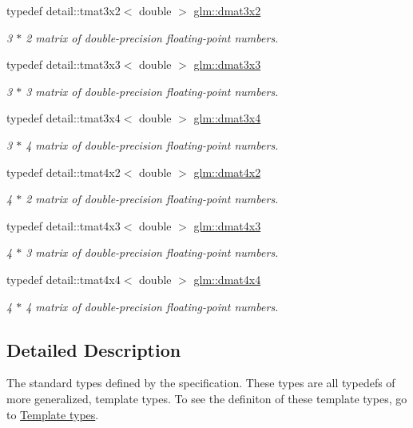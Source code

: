 \begin{DoxyCompactItemize}
typedef detail\-::tmat3x2$<$ double $>$ \hyperlink{group__core__types_ga44d603bc9ed3688928f508fb161c71f0}{glm\-::dmat3x2}
\begin{DoxyCompactList}\small\item\em 3 $\ast$ 2 matrix of double-\/precision floating-\/point numbers. \end{DoxyCompactList}\item 
typedef detail\-::tmat3x3$<$ double $>$ \hyperlink{group__core__types_ga415251df22cffb39bc14078ff057a6c3}{glm\-::dmat3x3}
\begin{DoxyCompactList}\small\item\em 3 $\ast$ 3 matrix of double-\/precision floating-\/point numbers. \end{DoxyCompactList}\item 
typedef detail\-::tmat3x4$<$ double $>$ \hyperlink{group__core__types_ga9ec18b898499ad524dc93f2d4d78b877}{glm\-::dmat3x4}
\begin{DoxyCompactList}\small\item\em 3 $\ast$ 4 matrix of double-\/precision floating-\/point numbers. \end{DoxyCompactList}\item 
typedef detail\-::tmat4x2$<$ double $>$ \hyperlink{group__core__types_gaec598e6dda8b2119877d992f5e0c1bae}{glm\-::dmat4x2}
\begin{DoxyCompactList}\small\item\em 4 $\ast$ 2 matrix of double-\/precision floating-\/point numbers. \end{DoxyCompactList}\item 
typedef detail\-::tmat4x3$<$ double $>$ \hyperlink{group__core__types_ga47f7b642f84d1272a0dafa221c8fd720}{glm\-::dmat4x3}
\begin{DoxyCompactList}\small\item\em 4 $\ast$ 3 matrix of double-\/precision floating-\/point numbers. \end{DoxyCompactList}\item 
typedef detail\-::tmat4x4$<$ double $>$ \hyperlink{group__core__types_gaa505ead5e0b6d8bc504ccfeadbac83d5}{glm\-::dmat4x4}
\begin{DoxyCompactList}\small\item\em 4 $\ast$ 4 matrix of double-\/precision floating-\/point numbers. \end{DoxyCompactList}\end{DoxyCompactItemize}


\subsection{Detailed Description}
The standard types defined by the specification. These types are all typedefs of more generalized, template types. To see the definiton of these template types, go to \hyperlink{group__core__template}{Template types}. 


